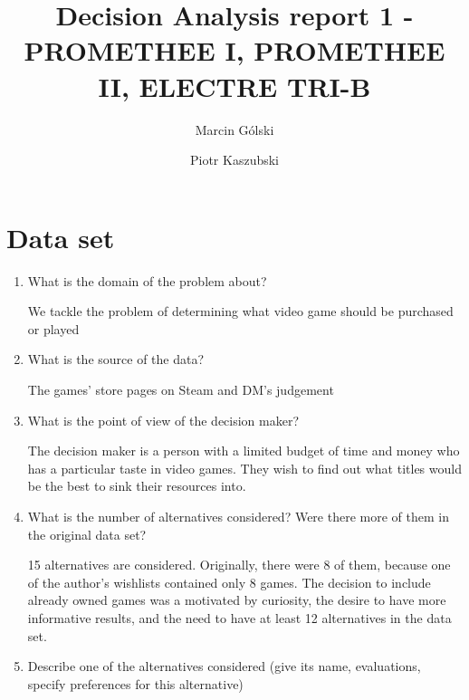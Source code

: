 \documentclass{article}
\author{Marcin Gólski \and Piotr Kaszubski}
\title{Decision Analysis report 1 - PROMETHEE I, PROMETHEE II, ELECTRE TRI-B}
\begin{document}
\maketitle

\section{Data set}

\begin{enumerate}

    \item What is the domain of the problem about?

    We tackle the problem of determining what video game should be purchased or played

    \item What is the source of the data?

    The games' store pages on Steam and DM's judgement

    \item What is the point of view of the decision maker?

    The decision maker is a person with a limited budget of time and money who has a particular taste in video games. They wish to find out what titles would be the best to sink their resources into.

    \item What is the number of alternatives considered? Were there more of them in the original data set?

    15 alternatives are considered. Originally, there were 8 of them, because one of the author's wishlists contained only 8 games. The decision to include already owned games was a motivated by curiosity, the desire to have more informative results, and the need to have at least 12 alternatives in the data set.

    \item Describe one of the alternatives considered (give its name, evaluations, specify preferences for this alternative)


\end{enumerate}
\end{document}
